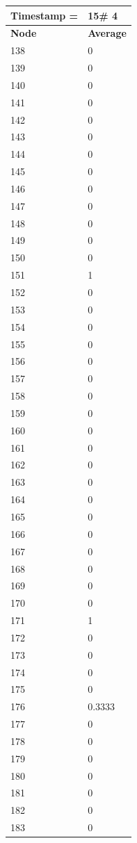 \begin{tabular}{|l||l|}
\hline
\textbf{Timestamp =} & \textbf{15}\# 4\\\hline
	\textbf{Node} & \textbf{Average} \\ \hline
\hline
	138 & 0 \\ \hline
	139 & 0 \\ \hline
	140 & 0 \\ \hline
	141 & 0 \\ \hline
	142 & 0 \\ \hline
	143 & 0 \\ \hline
	144 & 0 \\ \hline
	145 & 0 \\ \hline
	146 & 0 \\ \hline
	147 & 0 \\ \hline
	148 & 0 \\ \hline
	149 & 0 \\ \hline
	150 & 0 \\ \hline
	151 & 1 \\ \hline
	152 & 0 \\ \hline
	153 & 0 \\ \hline
	154 & 0 \\ \hline
	155 & 0 \\ \hline
	156 & 0 \\ \hline
	157 & 0 \\ \hline
	158 & 0 \\ \hline
	159 & 0 \\ \hline
	160 & 0 \\ \hline
	161 & 0 \\ \hline
	162 & 0 \\ \hline
	163 & 0 \\ \hline
	164 & 0 \\ \hline
	165 & 0 \\ \hline
	166 & 0 \\ \hline
	167 & 0 \\ \hline
	168 & 0 \\ \hline
	169 & 0 \\ \hline
	170 & 0 \\ \hline
	171 & 1 \\ \hline
	172 & 0 \\ \hline
	173 & 0 \\ \hline
	174 & 0 \\ \hline
	175 & 0 \\ \hline
	176 & 0.3333 \\ \hline
	177 & 0 \\ \hline
	178 & 0 \\ \hline
	179 & 0 \\ \hline
	180 & 0 \\ \hline
	181 & 0 \\ \hline
	182 & 0 \\ \hline
	183 & 0 \\ \hline
\end{tabular}
